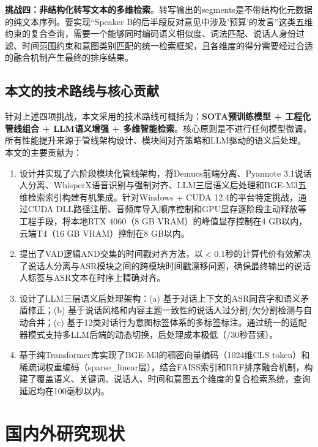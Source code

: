 \documentclass[12pt, a4paper]{article}
\begin{document}
\textbf{挑战四：非结构化转写文本的多维检索}。转写输出的segments是不带结构化元数据的纯文本序列。要实现``Speaker B的后半段反对意见中涉及'预算'的发言''这类五维约束的复合查询，需要一个能够同时编码语义相似度、词法匹配、说话人身份过滤、时间范围约束和意图类别匹配的统一检索框架，且各维度的得分需要经过合适的融合机制产生最终的排序结果。

\subsection{本文的技术路线与核心贡献}

针对上述四项挑战，本文采用的技术路线可概括为：\textbf{SOTA预训练模型 + 工程化管线组合 + LLM语义增强 + 多维智能检索}。核心原则是不进行任何模型微调，所有性能提升来源于管线架构设计、模块间对齐策略和LLM驱动的语义后处理。本文的主要贡献为：

\begin{enumerate}[label=(\arabic*)]
    \item 设计并实现了六阶段模块化管线架构，将Demucs前端分离、Pyannote 3.1说话人分离、WhisperX语音识别与强制对齐、LLM三层语义后处理和BGE-M3五维检索索引构建有机集成。针对Windows + CUDA 12.4的平台特定挑战，通过CUDA DLL路径注册、音频库导入顺序控制和GPU显存逐阶段主动释放等工程手段，将本地RTX 4060（8 GB VRAM）的峰值显存控制在4 GB以内，云端T4（16 GB VRAM）控制在8 GB以内。
    \item 提出了VAD逻辑AND交集的时间戳对齐方法，以$<$0.1秒的计算代价有效解决了说话人分离与ASR模块之间的跨模块时间戳漂移问题，确保最终输出的说话人标签与ASR文本在时序上精确对齐。
    \item 设计了LLM三层语义后处理架构：(a) 基于对话上下文的ASR同音字和语义矛盾修正；(b) 基于说话风格和内容主题一致性的说话人过分割/欠分割检测与自动合并；(c) 基于12类对话行为意图标签体系的多标签标注。通过统一的适配器模式支持多LLM后端的动态切换，后处理成本极低（/30秒音频）。
    \item 基于纯Transformer库实现了BGE-M3的稠密向量编码（1024维CLS token）和稀疏词权重编码（sparse\_linear层），结合FAISS索引和RRF排序融合机制，构建了覆盖语义、关键词、说话人、时间和意图五个维度的复合检索系统，查询延迟均在100毫秒以内。
\end{enumerate}

\section{国内外研究现状}
\end{document}

